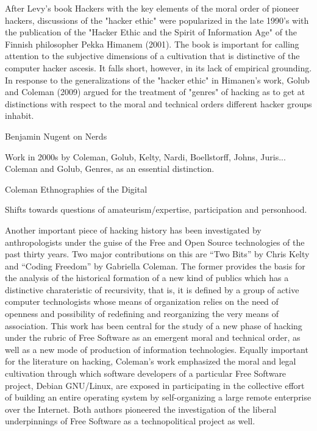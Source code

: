 \documentclass[10pt,letter,oneside]{scrartcl}
\begin{document}
After Levy's book Hackers with the key elements of the moral order of pioneer 
hackers, discussions of the "hacker ethic" were popularized in the late 1990's
with the publication of the "Hacker Ethic and the Spirit of Information Age" 
of the Finnish philosopher Pekka Himanem (2001). The book is important for calling
attention to the subjective dimensions of a cultivation that is distinctive
of the computer hacker ascesis.  It falls short, however, in its lack of empirical 
grounding.  In response to the generalizations of the "hacker ethic" in Himanen's
work, Golub and Coleman (2009) argued for the treatment of "genres" of hacking as to
get at distinctions with respect to the moral and technical orders different
hacker groups inhabit. 


Benjamin Nugent on Nerds %

Work in 2000s by Coleman, Golub, Kelty, Nardi, Boellstorff, Johns, Juris...  %
Coleman and Golub, Genres, as an essential distinction.                      %

Coleman Ethnographies of the Digital

Shifts towards questions of amateurism/expertise, participation and personhood. 

Another important piece of hacking history has been investigated by
anthropologists under the guise of the Free and Open Source technologies of the
past thirty years. Two major contributions on this are ``Two Bits'' by Chris
Kelty and ``Coding Freedom'' by Gabriella Coleman. The former provides the basis
for the analysis of the historical formation of a new kind of publics which has
a distinctive charateristic of recursivity, that is, it is defined by a group of
active computer technologists whose means of organization relies on the need of
openness and possibility of redefining and reorganizing the very means of
association. This work has been central for the study of a new phase of hacking
under the rubric of Free Software as an emergent moral and technical order, as
well as a new mode of production of information technologies. Equally important
for the literature on hacking, Coleman's work emphasized the moral and legal
cultivation through which software developers of a particular Free Software
project, Debian GNU/Linux, are exposed in participating in the collective 
effort of building an entire operating system by self-organizing a large 
remote enterprise over the Internet. Both authors pioneered the investigation 
of the liberal underpinnings of Free Software as a technopolitical
project as well.
\end{document}
